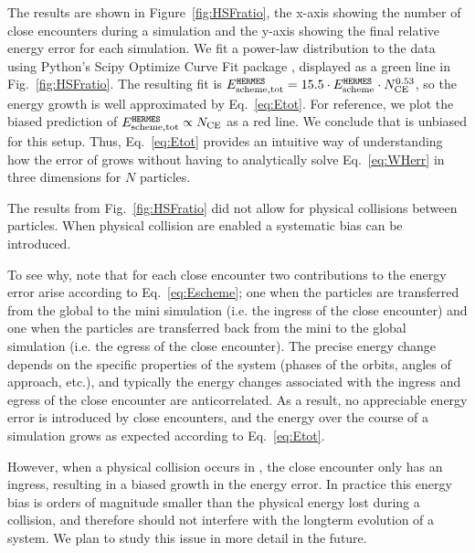 The results are shown in Figure~\ref{fig:HSFratio}, the x-axis showing the number of close encounters during a simulation and the y-axis showing the final relative energy error for each simulation.
We fit a power-law distribution to the data using Python's Scipy Optimize Curve Fit package \citep{Scipy2016}, displayed as a green line in Fig.~\ref{fig:HSFratio}. 
The resulting fit is $E_{\rm scheme,tot}^{{\sc \tt HERMES}}= 15.5 \cdot E_{\rm scheme}^{{\sc \tt HERMES}} \cdot N_{\rm CE}^{0.53}$, so the energy growth is well approximated by Eq.~\ref{eq:Etot}. 
For reference, we plot the biased prediction of $E_{\rm scheme,tot}^{{\sc \tt HERMES}} \propto N_{\rm CE}$ as a red line.
We conclude that \hermes is unbiased for this setup.
Thus, Eq.~\ref{eq:Etot} provides an intuitive way of understanding how the error of \hermes grows without having to analytically solve Eq.~\ref{eq:WHerr} in three dimensions for $N$ particles. 

The results from Fig.~\ref{fig:HSFratio} did not allow for physical collisions between particles. When physical collision are enabled a systematic bias can be introduced. 

To see why, note that for each close encounter two contributions to the energy error arise according to Eq.~\ref{eq:Escheme}; one when the particles are transferred from the global to the mini simulation (i.e. the ingress of the close encounter) and one when the particles are transferred back from the mini to the global simulation (i.e. the egress of the close encounter).
The precise energy change depends on the specific properties of the system (phases of the orbits, angles of approach, etc.), and typically the energy changes associated with the ingress and egress of the close encounter are anticorrelated. 
As a result, no appreciable energy error is introduced by close encounters, and the energy over the course of a simulation grows as expected according to Eq.~\ref{eq:Etot}.

However, when a physical collision occurs in \hermes,  the close encounter only has an ingress, resulting in a biased growth in the energy error. 
In practice this energy bias is orders of magnitude smaller than the physical energy lost during a collision, and therefore should not interfere with the longterm evolution of a system. 
We plan to study this issue in more detail in the future. 

